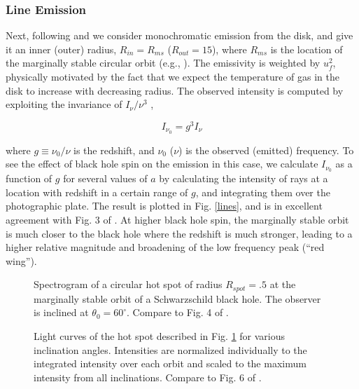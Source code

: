 \documentclass[apj]{emulateapj}
\begin{document}
\subsubsection{Line Emission}

Next, following \citet{schnittmanbertschinger2004} and \citet{bromley1997} we consider monochromatic emission from the disk, and give it an inner (outer) radius, $R_{in}=R_{ms}$ ($R_{out}=15$), where $R_{ms}$ is the location of the marginally stable circular orbit (e.g., \citealt{page1974}). The emissivity is weighted by $u_f^2$, physically motivated by the fact that we expect the temperature of gas in the disk to increase with decreasing radius. The observed intensity is computed by exploiting the invariance of $I_\nu / \nu^3$ \citep{mtw},

\begin{equation}
 I_{\nu_0} = g^3 I_{\nu}
\end{equation}

\noindent where $g \equiv \nu_0/\nu$ is the redshift, and $\nu_0$ ($\nu$) is the observed (emitted) frequency. To see the effect of black hole spin on the emission in this case, we calculate $I_{\nu_0}$ as a function of $g$ for several values of $a$ by calculating the intensity of rays at a location with redshift in a certain range of $g$, and integrating them over the photographic plate. The result is plotted in Fig. \ref{lines}, and is in excellent agreement with Fig. 3 of \citet{schnittmanbertschinger2004}. At higher black hole spin, the marginally stable orbit is much closer to the black hole where the redshift is much stronger, leading to a higher relative magnitude and broadening of the low frequency peak (``red wing'').

\begin{figure}
\caption{\label{spectrogram}Spectrogram of a circular hot spot of radius $R_{spot} = .5$ at the marginally stable orbit of a Schwarzschild black hole. The observer is inclined at $\theta_0=60^{\circ}$. Compare to Fig. 4 of \citet{schnittmanbertschinger2004}.}
\end{figure}

\begin{figure}
\caption{\label{lcurve}Light curves of the hot spot described in Fig. \ref{spectrogram} for various inclination angles. Intensities are normalized individually to the integrated intensity over each orbit and scaled to the maximum intensity from all inclinations. Compare to Fig. 6 of \citet{schnittmanbertschinger2004}.}
\end{figure}
\end{document}
